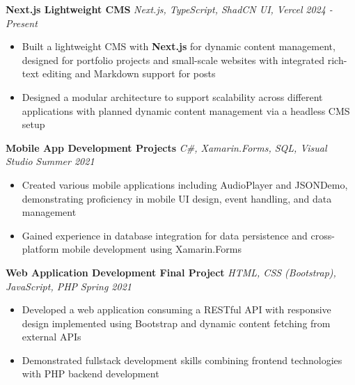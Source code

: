 \documentclass[letterpaper]{article}
\newenvironment{tightitemize}{%
  \begin{itemize}\small\setlength{\baselineskip}{0.95\baselineskip}\itemsep -1mm%
}{\end{itemize}}
\begin{document}
    {\textbf{Next.js Lightweight CMS}} {\sl Next.js, TypeScript, ShadCN UI, Vercel} \hfill \textsl{2024 - Present}\\
    \vspace{-2mm}
    \begin{tightitemize} \itemsep -1mm

        \item Built a lightweight CMS with \textbf{Next.js} for dynamic content management, designed for portfolio projects and small-scale websites with integrated rich-text editing and Markdown support for posts
        
        \item Designed a modular architecture to support scalability across different applications with planned dynamic content management via a headless CMS setup
        
    \end{tightitemize}
    \vspace{-2mm}

    {\textbf{Mobile App Development Projects}} {\sl C\#, Xamarin.Forms, SQL, Visual Studio} \hfill \textsl{Summer 2021}\\
    \vspace{-2mm}
    \begin{tightitemize} \itemsep -1mm

        \item Created various mobile applications including AudioPlayer and JSONDemo, demonstrating proficiency in mobile UI design, event handling, and data management
        
        \item Gained experience in database integration for data persistence and cross-platform mobile development using Xamarin.Forms
        
    \end{tightitemize}
    \vspace{-2mm}

    {\textbf{Web Application Development Final Project}} {\sl HTML, CSS (Bootstrap), JavaScript, PHP} \hfill \textsl{Spring 2021}\\
    \vspace{-2mm}
    \begin{tightitemize} \itemsep -1mm

        \item Developed a web application consuming a RESTful API with responsive design implemented using Bootstrap and dynamic content fetching from external APIs
        
        \item Demonstrated fullstack development skills combining frontend technologies with PHP backend development
        
    \end{tightitemize}
    \vspace{-2mm}
\end{document}
